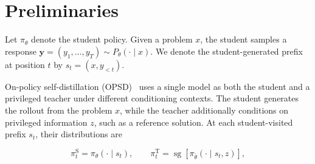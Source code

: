 \documentclass[letterpaper]{article} %
\begin{document}


\section{Preliminaries}
\label{sec:preliminaries}

Let $\pi_\theta$ denote the student policy. Given a problem $x$, the student samples a response $\mathbf y=(y_1,\ldots,y_T)\sim P_\theta(\cdot\mid x)$. We denote the student-generated prefix at position $t$ by $s_t=(x,y_{<t})$.

On-policy self-distillation (OPSD)~\cite{agarwal2024onpolicy,zhao2026selfdistilled} uses a single model as both the student and a privileged teacher under different conditioning contexts. The student generates the rollout from the problem $x$, while the teacher additionally conditions on privileged information $z$, such as a reference solution. At each student-visited prefix $s_t$, their distributions are


\begin{equation}
    \pi_t^{\mathrm{S}}
    =
    \pi_\theta(\cdot\mid s_t),
    \qquad
    \pi_t^{\mathrm{T}}
    =
    \operatorname{sg}
    \left[
        \pi_{\bar\theta}(\cdot\mid s_t,z)
    \right],
    \label{eq:student_teacher_distributions}
\end{equation}
\end{document}
